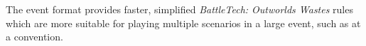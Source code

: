 The event format provides faster, simplified \emph{BattleTech: Outworlds Wastes} rules which are more suitable for playing multiple scenarios in a large event, such as at a convention.
